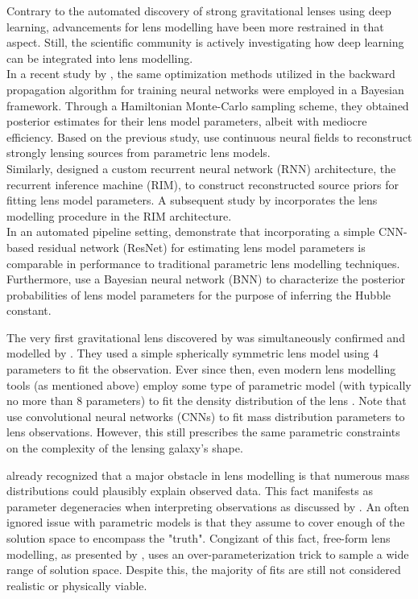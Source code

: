 \documentclass[a4paper,10pt]{article}
\begin{document}
Contrary to the automated discovery of strong gravitational lenses
using deep learning, advancements for lens modelling have been more
restrained in that aspect. Still, the scientific community is actively
investigating how deep learning can be integrated into lens
modelling. \\[0pt]
In a recent study by \cite{Gu22}, the same optimization methods
utilized in the backward propagation algorithm for training neural
networks were employed in a Bayesian framework. Through a Hamiltonian
Monte-Carlo sampling scheme, they obtained posterior estimates for
their lens model parameters, albeit with mediocre efficiency. Based on
the previous study, \cite{Mishra-Sharma22} use continuous neural
fields to reconstruct strongly lensing sources from parametric lens
models. \\[0pt]
Similarly, \cite{Morningstar19} designed a custom recurrent neural
network (RNN) architecture, the recurrent inference machine (RIM), to
construct reconstructed source priors for fitting lens model
parameters. A subsequent study by \cite{Adam22} incorporates the
lens modelling procedure in the RIM architecture. \\[0pt]
In an automated pipeline setting, \cite{Schuldt22,Chianese19}
demonstrate that incorporating a simple CNN-based residual network
(ResNet) for estimating lens model parameters is comparable in
performance to traditional parametric lens modelling techniques. \\[0pt]
Furthermore, \cite{Park20} use a Bayesian neural network (BNN) to
characterize the posterior probabilities of lens model parameters for
the purpose of inferring the Hubble constant.

The very first gravitational lens discovered by \cite{Walsh79} was
simultaneously confirmed and modelled by \cite{Young80}. They used
a simple spherically symmetric lens model using 4 parameters to fit
the observation. Ever since then, even modern lens modelling tools (as
mentioned above) employ some type of parametric model (with typically
no more than 8 parameters) to fit the density distribution of the lens
\citep[cf.][]{Birrer18,Hezaveh17,Tessore16,Oguri10}. Note that
\cite{Hezaveh17} use convolutional neural networks (CNNs) to fit
mass distribution parameters to lens observations. However, this still
prescribes the same parametric constraints on the complexity of the
lensing galaxy's shape.

\cite{Young81} already recognized that a major obstacle in lens
modelling is that numerous mass distributions could plausibly explain
observed data. This fact manifests as parameter degeneracies when
interpreting observations as discussed by
\cite{Saha00,Saha06,Schneider14,Birrer21}.  An often ignored
issue with parametric models is that they assume to cover enough of
the solution space to encompass the "truth".  Congizant of this fact,
free-form lens modelling, as presented by \citep{Saha04}, uses an
over-parameterization trick to sample a wide range of solution
space. Despite this, the majority of fits are still not considered
realistic or physically viable.
\end{document}
